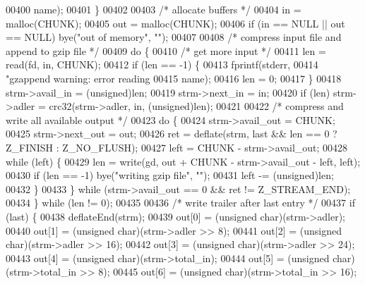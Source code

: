 \begin{DoxyCode}
{{00400                     name);
00401     \}
00402 
00403     \textcolor{comment}{/* allocate buffers */}
00404     in = malloc(CHUNK);
00405     out = malloc(CHUNK);
00406     \textcolor{keywordflow}{if} (in == NULL || out == NULL) bye(\textcolor{stringliteral}{"out of memory"}, \textcolor{stringliteral}{""});
00407 
00408     \textcolor{comment}{/* compress input file and append to gzip file */}
00409     \textcolor{keywordflow}{do} \{
00410         \textcolor{comment}{/* get more input */}
00411         len = read(fd, in, CHUNK);
00412         \textcolor{keywordflow}{if} (len == -1) \{
00413             fprintf(stderr,
00414                     \textcolor{stringliteral}{"gzappend warning: error reading %
00415                     name);
00416             len = 0;
00417         \}
00418         strm->avail\_in = (unsigned)len;
00419         strm->next\_in = in;
00420         \textcolor{keywordflow}{if} (len) strm->adler = crc32(strm->adler, in, (\textcolor{keywordtype}{unsigned})len);
00421 
00422         \textcolor{comment}{/* compress and write all available output */}
00423         \textcolor{keywordflow}{do} \{
00424             strm->avail\_out = CHUNK;
00425             strm->next\_out = out;
00426             ret = deflate(strm, last && len == 0 ? Z\_FINISH : Z\_NO\_FLUSH);
00427             left = CHUNK - strm->avail\_out;
00428             \textcolor{keywordflow}{while} (left) \{
00429                 len = write(gd, out + CHUNK - strm->avail\_out - left, left);
00430                 \textcolor{keywordflow}{if} (len == -1) bye(\textcolor{stringliteral}{"writing gzip file"}, \textcolor{stringliteral}{""});
00431                 left -= (unsigned)len;
00432             \}
00433         \} \textcolor{keywordflow}{while} (strm->avail\_out == 0 && ret != Z\_STREAM\_END);
00434     \} \textcolor{keywordflow}{while} (len != 0);
00435 
00436     \textcolor{comment}{/* write trailer after last entry */}
00437     \textcolor{keywordflow}{if} (last) \{
00438         deflateEnd(strm);
00439         out[0] = (\textcolor{keywordtype}{unsigned} char)(strm->adler);
00440         out[1] = (\textcolor{keywordtype}{unsigned} char)(strm->adler >> 8);
00441         out[2] = (\textcolor{keywordtype}{unsigned} char)(strm->adler >> 16);
00442         out[3] = (\textcolor{keywordtype}{unsigned} char)(strm->adler >> 24);
00443         out[4] = (\textcolor{keywordtype}{unsigned} char)(strm->total\_in);
00444         out[5] = (\textcolor{keywordtype}{unsigned} char)(strm->total\_in >> 8);
00445         out[6] = (\textcolor{keywordtype}{unsigned} char)(strm->total\_in >> 16);
}}}
\end{DoxyCode}
